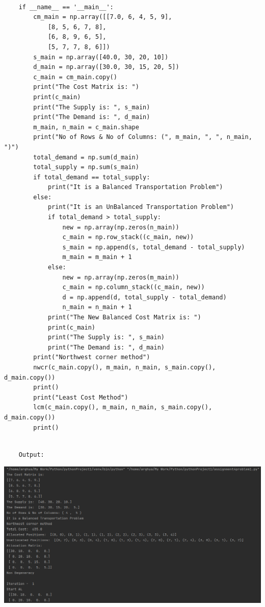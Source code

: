 \documentclass[12pt, letterpaper, twoside]{book}
\begin{document}
\begin{lstlisting}    
		
	if __name__ == '__main__':
		cm_main = np.array([[7.0, 6, 4, 5, 9],
			[8, 5, 6, 7, 8],
			[6, 8, 9, 6, 5],
			[5, 7, 7, 8, 6]])
		s_main = np.array([40.0, 30, 20, 10])
		d_main = np.array([30.0, 30, 15, 20, 5])
		c_main = cm_main.copy()
		print("The Cost Matrix is: ")
		print(c_main)
		print("The Supply is: ", s_main)
		print("The Demand is: ", d_main)
		m_main, n_main = c_main.shape
		print("No of Rows & No of Columns: (", m_main, ", ", n_main, ")")
		total_demand = np.sum(d_main)
		total_supply = np.sum(s_main)
		if total_demand == total_supply:
			print("It is a Balanced Transportation Problem")
		else:
			print("It is an UnBalanced Transportation Problem")
			if total_demand > total_supply:
				new = np.array(np.zeros(n_main))
				c_main = np.row_stack((c_main, new))
				s_main = np.append(s, total_demand - total_supply)
				m_main = m_main + 1
			else:
				new = np.array(np.zeros(m_main))
				c_main = np.column_stack((c_main, new))
				d = np.append(d, total_supply - total_demand)
				n_main = n_main + 1
			print("The New Balanced Cost Matrix is: ")
			print(c_main)
			print("The Supply is: ", s_main)
			print("The Demand is: ", d_main)
		print("Northwest corner method")
		nwcr(c_main.copy(), m_main, n_main, s_main.copy(), d_main.copy())
		print()
		print("Least Cost Method")
		lcm(c_main.copy(), m_main, n_main, s_main.copy(), d_main.copy())
		print()

\end{lstlisting}
\pagebreak
\begin{lstlisting}

	Output:

\end{lstlisting}

\includegraphics[width=550pt]{Output1}
\end{document}
